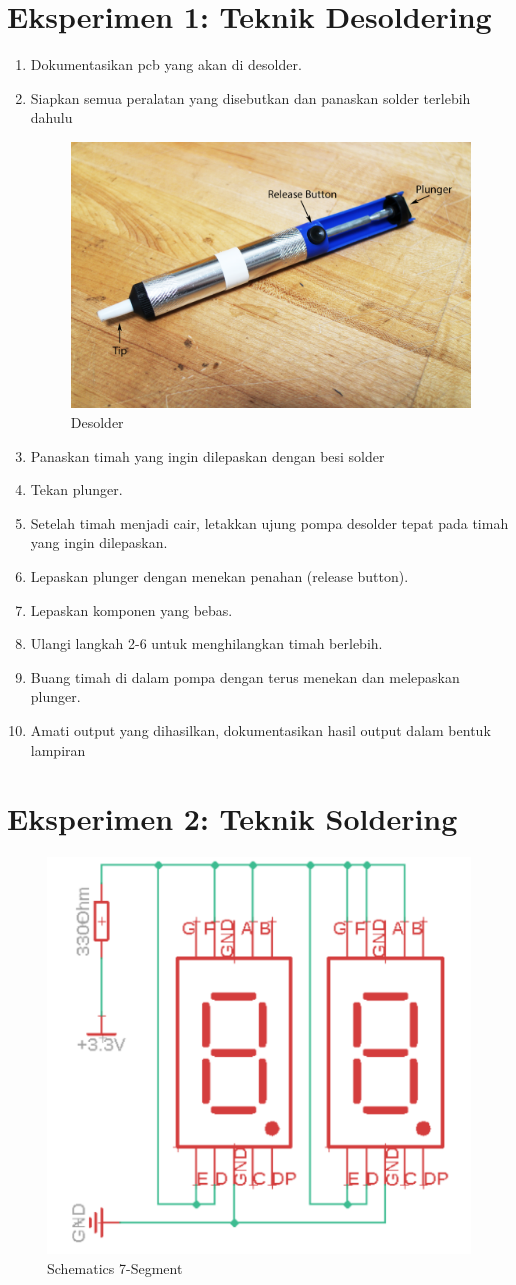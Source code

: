 \section{Eksperimen 1: Teknik Desoldering}
\begin{enumerate}
    \item Dokumentasikan pcb yang akan di desolder.
    \item Siapkan semua peralatan yang disebutkan dan panaskan solder terlebih dahulu
        \begin{figure}[H]
            \centering
            \includegraphics[width=0.6\linewidth]{P1/img/desolder.png}
            \caption{Desolder}
            \label{fig:desolder}
        \end{figure}
    \item Panaskan timah yang ingin  dilepaskan dengan besi solder
    \item Tekan plunger.
    \item Setelah timah menjadi cair, letakkan ujung pompa desolder tepat pada timah yang ingin dilepaskan.
    \item Lepaskan plunger dengan menekan penahan (release button).
    \item Lepaskan komponen yang bebas.
    \item Ulangi langkah 2-6 untuk menghilangkan timah berlebih.
    \item Buang timah di dalam pompa dengan terus menekan dan melepaskan plunger.
    \item Amati output yang dihasilkan, dokumentasikan hasil output dalam bentuk lampiran
\end{enumerate}
\section{Eksperimen 2: Teknik Soldering}
\begin{figure}[H]
    \centering
    \includegraphics[width=0.4\linewidth]{P1/img/schematics.png}
    \caption{Schematics 7-Segment}
    \label{fig:schematics7Segment}
\end{figure}

